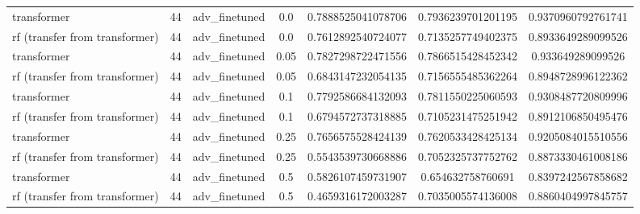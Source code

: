 \begin{table}[htbp]
\begin{tabular}{lcccccc}
transformer & 44 & adv\_finetuned & 0.0 & 0.7888525041078706 & 0.7936239701201195 & 0.9370960792761741 \\
rf (transfer from transformer) & 44 & adv\_finetuned & 0.0 & 0.7612892540724077 & 0.7135257749402375 & 0.8933649289099526 \\
transformer & 44 & adv\_finetuned & 0.05 & 0.7827298722471556 & 0.7866515428452342 & 0.933649289099526 \\
rf (transfer from transformer) & 44 & adv\_finetuned & 0.05 & 0.6843147232054135 & 0.7156555485362264 & 0.8948728996122362 \\
transformer & 44 & adv\_finetuned & 0.1 & 0.7792586684132093 & 0.7811550225060593 & 0.9308487720809996 \\
rf (transfer from transformer) & 44 & adv\_finetuned & 0.1 & 0.6794572737318885 & 0.7105231475251942 & 0.8912106850495476 \\
transformer & 44 & adv\_finetuned & 0.25 & 0.7656575528424139 & 0.7620533428425134 & 0.9205084015510556 \\
rf (transfer from transformer) & 44 & adv\_finetuned & 0.25 & 0.5543539730668886 & 0.7052325737752762 & 0.8873330461008186 \\
transformer & 44 & adv\_finetuned & 0.5 & 0.5826107459731907 & 0.654632758760691 & 0.8397242567858682 \\
rf (transfer from transformer) & 44 & adv\_finetuned & 0.5 & 0.4659316172003287 & 0.7035005574136008 & 0.8860404997845757 \\
\bottomrule
\end{tabular}
\end{table}